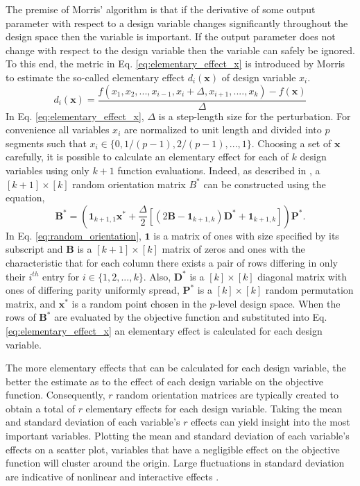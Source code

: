The premise of Morris' algorithm is that if the derivative of some output parameter with respect to a design variable changes significantly throughout the design space then the variable is important. If the output parameter does not change with respect to the design variable then the variable can safely be ignored. To this end, the metric in Eq. \ref{eq:elementary_effect_x} is introduced by Morris to estimate the so-called elementary effect $d_i\left(\textbf{x}\right)$ of design variable $x_i$.
\begin{equation}
\label{eq:elementary_effect_x}
   d_i\left(\textbf{x}\right) = \frac{f\left(x_1,x_2,...,x_{i-1},x_i+\Delta,x_{i+1},....,x_k 										\right) - f\left(\textbf{x}\right)}
   								{\Delta}      
\end{equation}  
In Eq. \ref{eq:elementary_effect_x}, $\Delta$ is a step-length size for the perturbation. For convenience all variables $x_i$ are normalized to unit length and divided into $p$ segments such that $x_i\in\lbrace 0,1/(p-1),2/(p-1),...,1\rbrace$. Choosing a set of $\textbf{x}$ carefully, it is possible to calculate an elementary effect for each of $k$ design variables using only $k+1$ function evaluations. Indeed, as described in \cite{Morris}, a $[k+1]\times [k]$ random orientation matrix $B^*$ can be constructed using the equation,
\begin{equation}
\label{eq:random_orientation}
   \textbf{B}^* = \left(\textbf{1}_{k+1,1}\textbf{x}^* + \frac{\Delta}{2}\left[
                   \left(2\textbf{B} - \textbf{1}_{k+1,k}\right)\textbf{D}^* + 
                    \textbf{1}_{k+1,k}\right]\right)\textbf{P}^*.
\end{equation}            
In Eq. \ref{eq:random_orientation}, $\textbf{1}$ is a matrix of ones with size specified by its subscript and $\textbf{B}$ is a $[k+1]\times [k]$ matrix of zeros and ones with the characteristic that for each column there exists a pair of rows differing in only their $i^{th}$ entry for $i\in\lbrace 1,2,...,k\rbrace$. Also, $\textbf{D}^*$ is a $[k]\times [k]$ diagonal matrix with ones of differing parity uniformly spread, $\textbf{P}^*$ is a $[k]\times [k]$ random permutation matrix, and $\textbf{x}^*$ is a random point chosen in the $p$-level design space. When the rows of $\textbf{B}^*$ are evaluated by the objective function and substituted into Eq. \ref{eq:elementary_effect_x} an elementary effect is calculated for each design variable. 

The more elementary effects that can be calculated for each design variable, the better the estimate as to the effect of each design variable on the objective function. Consequently, $r$ random orientation matrices are typically created to obtain a total of $r$ elementary effects for each design variable. Taking the mean and standard deviation of each variable's $r$ effects can yield insight into the most important variables. Plotting the mean and standard deviation of each variable's effects on a scatter plot, variables that have a negligible effect on the objective function will cluster around the origin. Large fluctuations in standard deviation are indicative of nonlinear and interactive effects \cite{Morris}. 

